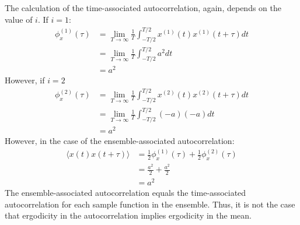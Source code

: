 \begin{homeworkProblem}
The calculation of the time-associated autocorrelation, again, depends on the value of $
i $. If $ i=1 $:
\begin{align*}
   \phi_{x}^{(1)}(\tau) &=
   \lim_{T \to \infty}\frac{1}{T} \int_{-T/2}^{T/2} x^{(1)}(t)x^{(1)}(t+\tau) dt
   \\
   &= \lim_{T \to \infty} \frac{1}{T}\int_{-T/2}^{T/2}a^2 dt \\
   &= a^2
\end{align*}
However, if $ i=2 $
\begin{align*}
   \phi_{x}^{(2)}(\tau) &=
   \lim_{T \to \infty}\frac{1}{T} \int_{-T/2}^{T/2} x^{(2)}(t)x^{(2)}(t+\tau) dt
   \\
   &= \lim_{T \to \infty} \frac{1}{T}\int_{-T/2}^{T/2}(-a)(-a) dt \\
   &= a^2
\end{align*}
However, in the case of the ensemble-associated autocorrelation:
\begin{align*}
   \langle x(t) x(t +\tau) \rangle &= \frac{1}{2}\phi_{x}^{(1)}(\tau) +
   \frac{1}{2} \phi_{x}^{(2)}(\tau) \\
   &= \frac{a^2}{2} + \frac{a^2}{2} \\
   &= a^2
\end{align*}
The ensemble-associated autocorrelation equals the time-associated
autocorrelation for each sample function in the ensemble. Thus, it is not the
case that ergodicity in the autocorrelation implies ergodicity in the mean.
\end{homeworkProblem}
